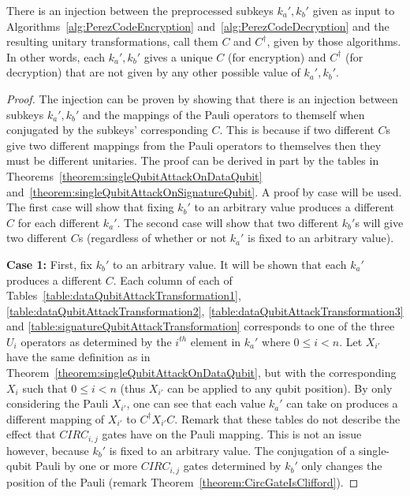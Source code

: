 \begin{theorem}
There is an injection between the preprocessed subkeys $k_a',k_b'$ given as input to Algorithms~\ref{alg:PerezCodeEncryption} and~\ref{alg:PerezCodeDecryption} and the resulting unitary transformations, call them $C$ and $C^{\dagger}$, given by those algorithms. In other words, each $k_a',k_b'$ gives a unique $C$ (for encryption) and $C^{\dagger}$ (for decryption) that are not given by any other possible value of  $k_a',k_b'$.
\end{theorem}
\begin{proof}
The injection can be proven by showing that there is an injection between subkeys $k_a',k_b'$ and the mappings of the Pauli operators to themself when conjugated by the subkeys' corresponding $C$. This is because if two different $C$s give two different mappings from the Pauli operators to themselves then they must be different unitaries. The proof can be derived in part by the tables in Theorems~\ref{theorem:singleQubitAttackOnDataQubit} and~\ref{theorem:singleQubitAttackOnSignatureQubit}. A proof by case will be used. The first case will show that fixing $k_b'$ to an arbitrary value produces a different $C$ for each different $k_a'$. The second case will show that two different $k_b'$s will give two different $C$s (regardless of whether or not $k_a'$ is fixed to an arbitrary value).

\textbf{Case 1:} First, fix $k_b'$ to an arbitrary value. It will be shown that each $k_a'$ produces a different $C$. Each column of each of Tables~\ref{table:dataQubitAttackTransformation1},\ref{table:dataQubitAttackTransformation2}, \ref{table:dataQubitAttackTransformation3} and \ref{table:signatureQubitAttackTransformation} corresponds to one of the three $U_i$ operators as determined by the $i^{th}$ element in $k_a'$ where $0 \leq i < n$. Let $X_{i'}$ have the same definition as in Theorem~\ref{theorem:singleQubitAttackOnDataQubit}, but with the corresponding $X_i$ such that $0 \leq i < n$ (thus $X_{i'}$ can be applied to any qubit position). By only considering the Pauli $X_{i'}$, one can see that each value $k_a'$ can take on produces a different mapping of $X_{i'}$ to $C^{\dagger} X_{i'} C$. Remark that these tables do not describe the effect that $\mathit{CIRC}_{i,j}$ gates have on the Pauli mapping. This is not an issue however, because $k_b'$ is fixed to an arbitrary value. The conjugation of a single-qubit Pauli by one or more $\mathit{CIRC}_{i,j}$ gates determined by $k_b'$ only changes the position of the Pauli (remark Theorem~\ref{theorem:CircGateIsClifford}).


\end{proof}
